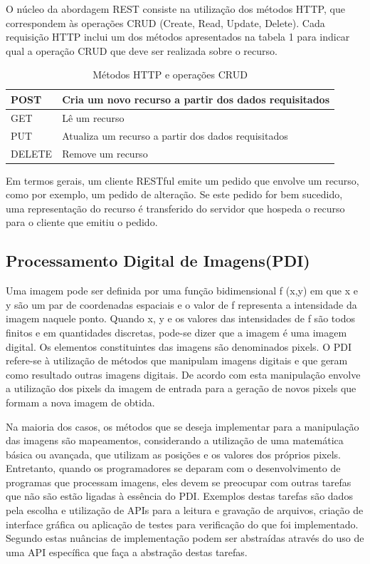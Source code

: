 \documentclass[12pt]{article}
\begin{document}
O núcleo da abordagem REST consiste na utilização dos métodos HTTP, que correspondem às operações CRUD (Create, Read, Update, Delete). Cada requisição HTTP inclui um dos métodos apresentados na tabela 1 para indicar qual a operação CRUD que deve ser realizada sobre o recurso.
\begin{table}[ht]
	\centering
	\caption{Métodos HTTP e operações CRUD}
	\label{tab:Table1}
	\smallskip
	\begin{tabular}{ |l|l| }
		\hline
		POST & Cria um novo recurso a partir dos dados requisitados \\ \hline
		GET & Lê um recurso \\ \hline
		PUT & Atualiza um recurso a partir dos dados requisitados \\ \hline
		DELETE & Remove um recurso \\
		\hline
	\end{tabular}
\end{table}

Em termos gerais, um cliente RESTful emite um pedido que envolve um recurso, como
por exemplo, um pedido de alteração. Se este pedido for bem sucedido, uma representação
do recurso é transferido do servidor que hospeda o recurso para o cliente que emitiu o
pedido.


\subsection{Processamento Digital de Imagens(PDI)}

Uma imagem pode ser definida por uma função bidimensional f (x,y) em que x e y são um par de coordenadas espaciais e o valor de f representa a intensidade da
imagem naquele ponto. Quando x, y e os valores das intensidades de f são todos finitos e em quantidades discretas, pode-se dizer que a imagem é uma imagem
digital. Os elementos constituintes das imagens são denominados pixels. O PDI refere-se à utilização de métodos que manipulam imagens digitais e que geram
como resultado outras imagens digitais. De acordo com \cite{gonzalez:08} esta manipulação envolve a utilização dos pixels da imagem de entrada para a geração de novos pixels que formam a
nova imagem de obtida.

Na maioria dos casos, os métodos que se deseja implementar para a manipulação das imagens são mapeamentos, considerando a utilização de uma matemática
básica ou avançada, que utilizam as posições e os valores dos próprios pixels. Entretanto, quando os programadores se deparam com o desenvolvimento de
programas que processam imagens, eles devem se preocupar com outras tarefas que não são estão ligadas à essência do PDI. Exemplos destas tarefas são dados
pela escolha e utilização de APIs para a leitura e gravação de arquivos, criação de interface gráfica ou aplicação de testes para verificação do que foi
implementado. Segundo \cite{gonzalez:08,jain:89} estas nuâncias de implementação podem ser abstraídas através do uso de uma API específica que faça a abstração destas tarefas.
\end{document}
